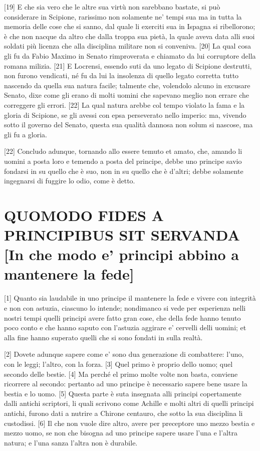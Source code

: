 {[}19{]} E che sia vero che le altre sua virtù non sarebbano bastate, si
può considerare in Scipione, rarissimo non solamente ne' tempi sua ma in
tutta la memoria delle cose che si sanno, dal quale li exerciti sua in
Ispagna si ribellorono; è che non nacque da altro che dalla troppa sua
pietà, la quale aveva data alli suoi soldati più licenza che alla
disciplina militare non si conveniva. {[}20{]} La qual cosa gli fu da
Fabio Maximo in Senato rimproverata e chiamato da lui corruptore della
romana milizia. {[}21{]} E Locrensi, essendo suti da uno legato di
Scipione destrutti, non furono vendicati, né fu da lui la insolenza di
quello legato corretta tutto nascendo da quella sua natura facile;
talmente che, volendolo alcuno in excusare Senato, dixe come gli erano
di molti uomini che sapevano meglio non errare che correggere gli
errori. {[}22{]} La qual natura arebbe col tempo violato la fama e la
gloria di Scipione, se gli avessi con epsa perseverato nello imperio:
ma, vivendo sotto il governo del Senato, questa sua qualità dannosa non
solum si nascose, ma gli fu a gloria.

{[}22{]} Concludo adunque, tornando allo essere temuto et amato, che,
amando li uomini a posta loro e temendo a posta del principe, debbe uno
principe savio fondarsi in su quello che è suo, non in su quello che è
d'altri; debbe solamente ingegnarsi di fuggire lo odio, come è detto.

\quebra\section{QUOMODO FIDES A PRINCIPIBUS SIT SERVANDA
{[}In che modo e' principi abbino a mantenere la fede{]}}

{[}1{]} Quanto sia laudabile in uno principe il mantenere la fede e
vivere con integrità e non con astuzia, ciascuno lo intende; nondimanco
si vede per esperienza nelli nostri tempi quelli principi avere fatto
gran cose, che della fede hanno tenuto poco conto e che hanno saputo con
l'astuzia aggirare e' cervelli delli uomini; et alla fine hanno superato
quelli che si sono fondati in sulla realtà.

{[}2{]} Dovete adunque sapere come e' sono dua generazione di
combattere: l'uno, con le leggi; l'altro, con la forza. {[}3{]} Quel
primo è proprio dello uomo; quel secondo delle bestie. {[}4{]} Ma perché
el primo molte volte non basta, conviene ricorrere al secondo: pertanto
ad uno principe è necessario sapere bene usare la bestia e lo uomo.
{[}5{]} Questa parte è suta insegnata alli principi copertamente dalli
antichi scriptori, li quali scrivono come Achille e molti altri di
quelli principi antichi, furono dati a nutrire a Chirone centauro, che
sotto la sua disciplina li custodissi. {[}6{]} Il che non vuole dire
altro, avere per preceptore uno mezzo bestia e mezzo uomo, se non che
bisogna ad uno principe sapere usare l'una e l'altra natura; e l'una
sanza l'altra non è durabile.

